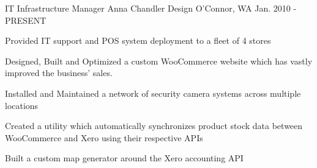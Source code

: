 

\begin{cventries}

  \cventry
    {IT Infrastructure Manager} %
    {Anna Chandler Design} %
    {O'Connor, WA} %
    {Jan. 2010 - PRESENT} %
    {
      \begin{cvitems} %
        \item {Provided IT support and POS system deployment to a fleet of 4 stores}
        \item {Designed, Built and Optimized a custom WooCommerce website which has vastly improved the business’ sales.}
        \item {Installed and Maintained a network of security camera systems across multiple locations}
        \item {Created a utility which automatically synchronizes product stock data between WooCommerce and Xero using their respective APIs}
        \item {Built a custom map generator around the Xero accounting API}
      \end{cvitems}
    }


\end{cventries}
